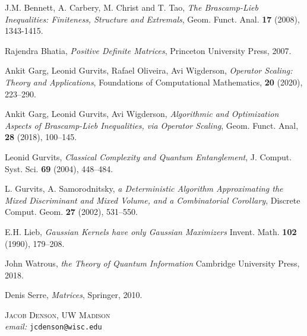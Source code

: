 \documentclass[12pt]{article}
\begin{document}
\begin{thebibliography}{3}

    J.M. Bennett, A. Carbery, M. Christ and T. Tao,
    \emph{The {B}rascamp-{L}ieb Inequalities: Finiteness, Structure and Extremals},
    Geom. Funct. Anal. {\bf 17} (2008), 1343-1415.

    Rajendra Bhatia,
    \emph{Positive Definite Matrices},
    Princeton University Press, 2007.

    Ankit Garg, Leonid Gurvits, Rafael Oliveira, Avi Wigderson,
    \emph{Operator Scaling: Theory and Applications},
    Foundations of Computational Mathematics, {\bf 20} (2020), 223--290.

    Ankit Garg, Leonid Gurvits, Avi Wigderson,
    \emph{Algorithmic and Optimization Aspects of {B}rascamp-{L}ieb Inequalities, via Operator Scaling},
    Geom. Funct. Anal, {\bf 28} (2018), 100--145.

    Leonid Gurvits,
    \emph{Classical Complexity and Quantum Entanglement},
    J. Comput. Syst. Sci. {\bf 69} (2004), 448--484.

    L. Gurvits, A. Samorodnitsky,
    \emph{a Deterministic Algorithm Approximating the Mixed Discriminant and Mixed Volume, and a Combinatorial Corollary},
    Discrete Comput. Geom. {\bf 27} (2002), 531--550.

    E.H. Lieb,
    \emph{{G}aussian Kernels have only {G}aussian Maximizers}
    Invent. Math. {\bf 102} (1990), 179--208.

    John Watrous,
    \emph{the Theory of Quantum Information}
    Cambridge University Press, 2018.

    Denis Serre,
    \emph{Matrices},
    Springer, 2010.

\end{thebibliography}

\noindent \textsc{Jacob Denson, UW Madison}\\
\textit{email:} \texttt{jcdenson@wisc.edu}
\end{document}
